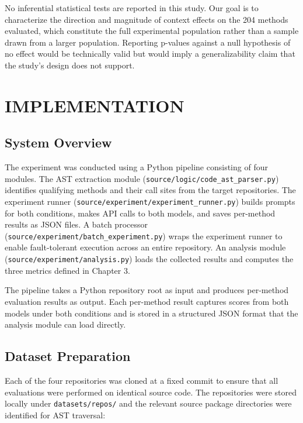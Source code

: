 \documentclass[12pt]{report}
\begin{document}
No inferential statistical tests are reported in this study. Our goal is to characterize the direction and magnitude of context effects on the 204 methods evaluated, which constitute the full experimental population rather than a sample drawn from a larger population. Reporting p-values against a null hypothesis of no effect would be technically valid but would imply a generalizability claim that the study's design does not support.

\chapter{IMPLEMENTATION}

\section{System Overview}

The experiment was conducted using a Python pipeline consisting of four modules. The AST extraction module (\texttt{source/logic/code\_ast\_parser.py}) identifies qualifying methods and their call sites from the target repositories. The experiment runner (\texttt{source/experiment/experiment\_runner.py}) builds prompts for both conditions, makes API calls to both models, and saves per-method results as JSON files. A batch processor (\texttt{source/experiment/batch\_experiment.py}) wraps the experiment runner to enable fault-tolerant execution across an entire repository. An analysis module (\texttt{source/experiment/analysis.py}) loads the collected results and computes the three metrics defined in Chapter 3.

The pipeline takes a Python repository root as input and produces per-method evaluation results as output. Each per-method result captures scores from both models under both conditions and is stored in a structured JSON format that the analysis module can load directly.

\section{Dataset Preparation}

Each of the four repositories was cloned at a fixed commit to ensure that all evaluations were performed on identical source code. The repositories were stored locally under \texttt{datasets/repos/} and the relevant source package directories were identified for AST traversal:
\end{document}
